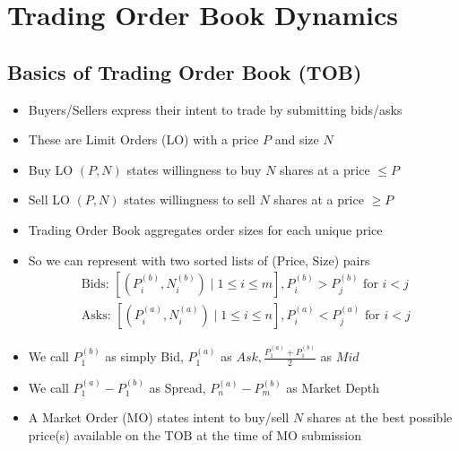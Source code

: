 \documentclass[10pt]{article}
\begin{document}



\section{Trading Order Book Dynamics} 

\subsection{Basics of Trading Order Book (TOB)}

\begin{itemize} 
    \item Buyers/Sellers express their intent to trade by submitting bids/asks
    \item These are Limit Orders (LO) with a price $P$ and size $N$
    \item Buy LO $(P, N)$ states willingness to buy $N$ shares at a price $\leq P$
    \item Sell LO $(P, N)$ states willingness to sell $N$ shares at a price $\geq P$
    \item Trading Order Book aggregates order sizes for each unique price
    \item So we can represent with two sorted lists of (Price, Size) pairs
    $$
    \begin{array}{l}
    \text { Bids: }\left[\left(P_{i}^{(b)}, N_{i}^{(b)}\right) \mid 1 \leq i \leq m\right], P_{i}^{(b)}>P_{j}^{(b)} \text { for } i<j \\
    \text { Asks: }\left[\left(P_{i}^{(a)}, N_{i}^{(a)}\right) \mid 1 \leq i \leq n\right], P_{i}^{(a)}<P_{j}^{(a)} \text { for } i<j
    \end{array}
    $$
    \item We call $P_{1}^{(b)}$ as simply Bid, $P_{1}^{(a)}$ as $A s k, \frac{P_{1}^{(a)}+P_{1}^{(b)}}{2}$ as $M i d$
    \item We call $P_{1}^{(a)}-P_{1}^{(b)}$ as Spread, $P_{n}^{(a)}-P_{m}^{(b)}$ as Market Depth
    \item A Market Order (MO) states intent to buy/sell $N$ shares at the best possible price(s) available on the $\mathrm{TOB}$ at the time of $\mathrm{MO}$ submission
\end{itemize}
\end{document}
